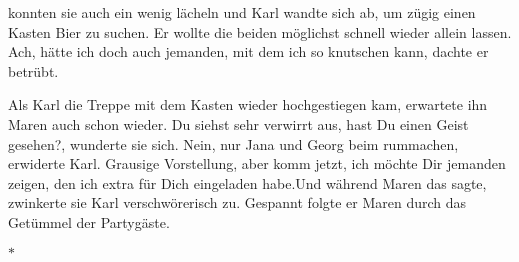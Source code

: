 \documentclass{article}
\begin{document}
konnten sie auch ein wenig lächeln und Karl wandte sich ab, um zügig einen Kasten Bier zu suchen. Er wollte die beiden möglichst schnell wieder allein lassen. Ach, hätte ich doch auch jemanden, mit dem ich so knutschen kann, dachte er betrübt.
	
	Als Karl die Treppe mit dem Kasten wieder hochgestiegen kam, erwartete ihn Maren auch schon wieder. \guillemotright Du siehst sehr verwirrt aus, hast Du einen Geist gesehen?\guillemotleft, wunderte sie sich. \guillemotright Nein, nur Jana und Georg beim rummachen\guillemotleft, erwiderte Karl. \guillemotright Grausige Vorstellung, aber komm jetzt, ich möchte Dir jemanden zeigen, den ich extra für Dich eingeladen habe.\guillemotleft Und während Maren das sagte, zwinkerte sie Karl verschwörerisch zu. Gespannt folgte er Maren durch das Getümmel der Partygäste.
	
	\begin{center}
		$\ast$
	\end{center}
\end{document}
